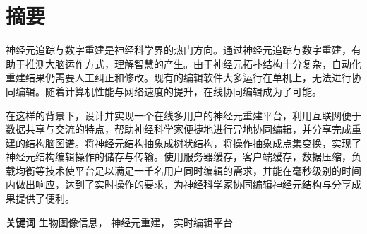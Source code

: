 \chapter{摘要}

神经元追踪与数字重建是神经科学界的热门方向。通过神经元追踪与数字重建，有助于推测大脑运作方式，理解智慧的产生。由于神经元拓扑结构十分复杂，自动化重建结果仍需要人工纠正和修改。现有的编辑软件大多运行在单机上，无法进行协同编辑。随着计算机性能与网络速度的提升，在线协同编辑成为了可能。

在这样的背景下，设计并实现一个在线多用户的神经元重建平台，利用互联网便于数据共享与交流的特点，帮助神经科学家便捷地进行异地协同编辑，并分享完成重建的结构脑图谱。将神经元结构抽象成树状结构，将操作抽象成点集变换，实现了神经元结构编辑操作的储存与传输。使用服务器缓存，客户端缓存，数据压缩，负载均衡等技术使平台足以满足一千名用户同时编辑的需求，并能在毫秒级别的时间内做出响应，达到了实时操作的要求，为神经科学家协同编辑神经元结构与分享成果提供了便利。

{
    \vspace{1em}
    \setlength{\parindent}{0em}
    \textbf{关键词} \; 生物图像信息， \; 神经元重建， \; 实时编辑平台 \par
}